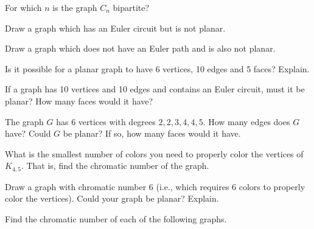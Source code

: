 \documentclass[11pt]{exam}
\newcommand{\vtx}[2]{node[fill,circle,inner sep=0pt, minimum size=7pt,label=#1:#2]{}}
\renewcommand{\v}{\vtx{above}{}}
\begin{document}
\begin{questions}
\begin{center}
\end{center}

\question For which $n$ is the graph $C_n$ bipartite?

\question Draw a graph which has an Euler circuit but is not planar.

\question Draw a graph which does not have an Euler path and is also not planar.

\question Is it possible for a planar graph to have 6 vertices, 10 edges and 5 faces?  Explain.

\question If a graph has 10 vertices and 10 edges and contains an Euler circuit, must it be planar?  How many faces would it have?

\question The graph $G$ has 6 vertices with degrees $2, 2, 3, 4, 4, 5$.  How many edges does $G$ have?  Could $G$ be planar?  If so, how many faces would it have.

\question What is the smallest number of colors you need to properly color the vertices of $K_{4,5}$.  That is, find the chromatic number of the graph.

\question Draw a graph with chromatic number 6 (i.e., which requires 6 colors to properly color the vertices).  Could your graph be planar?  Explain.

\question Find the chromatic number of each of the following graphs.

\begin{center}
  \hfill
  \hfill 
  \hfill
  \hfill
\end{center}


\end{questions}
\end{document}
